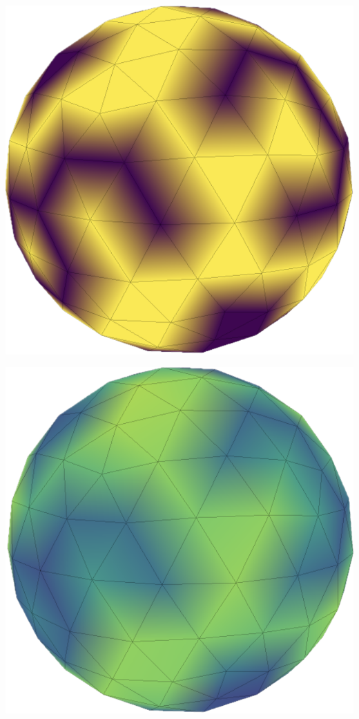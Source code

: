 \begin{center}
    \begin{minipage}[b]{0.5\columnwidth}
        \centering
        \includegraphics[width=0.95\linewidth]{../images/sphere_entropic.png}
    \end{minipage}%
    \begin{minipage}[b]{0.5\columnwidth}
        \centering
        \includegraphics[width=0.95\linewidth]{../images/sphere_smoothed.png}

\end{minipage}
\end{center}
